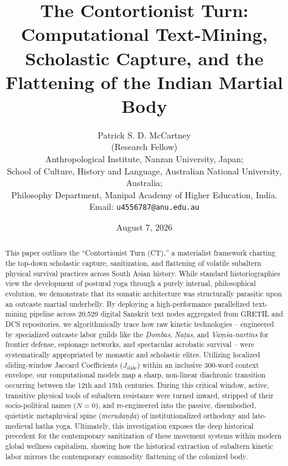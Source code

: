 \documentclass[11pt,twoside,letterpaper]{article}
\begin{document}
\title{\textbf{The Contortionist Turn: Computational Text-Mining, Scholastic Capture, and the Flattening of the Indian Martial Body}}

\author{%
  \small Patrick S. D. McCartney \\
  \small (Research Fellow) \\
  \small Anthropological Institute, Nanzan University, Japan; \\
  \small School of Culture, History and Language, Australian National University, Australia; \\
  \small Philosophy Department, Manipal Academy of Higher Education, India. \\
  \small Email: \texttt{u4556787@anu.edu.au}
}

\date{\small August 7, 2026}

\maketitle

\begin{abstract}
This paper outlines the ``Contortionist Turn (CT),'' a materialist framework charting the top-down scholastic capture, sanitization, and flattening of volatile subaltern physical survival practices across South Asian history. While standard historiographies view the development of postural yoga through a purely internal, philosophical evolution, we demonstrate that its somatic architecture was structurally parasitic upon an outcaste martial underbelly. By deploying a high-performance parallelized text-mining pipeline across 20,529 digital Sanskrit text nodes aggregated from GRETIL and DCS repositories, we algorithmically trace how raw kinetic technologies -- engineered by specialized outcaste labor guilds like the \textit{Ḍombas}, \textit{Naṭas}, and \textit{Vaṃśa-nartins} for frontier defense, espionage networks, and spectacular acrobatic survival -- were systematically appropriated by monastic and scholastic elites. Utilizing localized sliding-window Jaccard Coefficients ($J_{\text{slide}}$) within an inclusive 300-word context envelope, our computational models map a sharp, non-linear diachronic transition occurring between the 12th and 15th centuries. During this critical window, active, transitive physical tools of subaltern resistance were turned inward, stripped of their socio-political names ($N = 0$), and re-engineered into the passive, disembodied, quietistic metaphysical spine (\textit{merudaṇḍa}) of institutionalized orthodoxy and late-medieval hatha yoga. Ultimately, this investigation exposes the deep historical precedent for the contemporary sanitization of these movement systems within modern global wellness capitalism, showing how the historical extraction of subaltern kinetic labor mirrors the contemporary commodity flattening of the colonized body.
\end{abstract}
\end{document}
